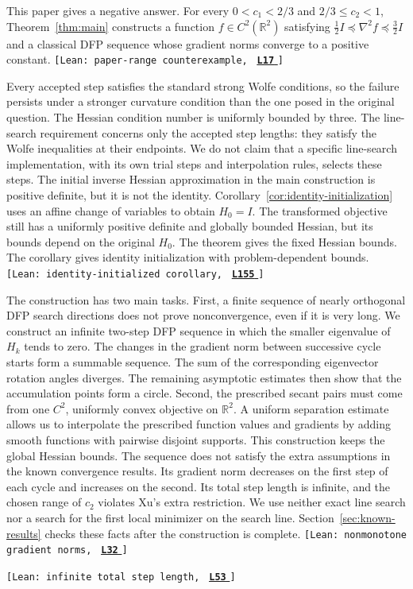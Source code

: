 \documentclass[11pt]{article}
\newcommand{\R}{\mathbb R}
\newcommand{\leanLinkText}[1]{%
  \underline{\textbf{#1}}%
}
\newcommand{\leanSnapshot}{e308927f5b7930bdd002f0c0e42b9d112ad821cb}
\newcommand{\leanClaimTag}[3]{%
  {\footnotesize\texttt{[Lean: #1, }}%
  \href{https://github.com/imathwy/DFP_wolfe_local/blob/\leanSnapshot/#2?plain=1\#L#3}%
    {\leanLinkText{\footnotesize\texttt{L#3}}}%
  {\footnotesize\texttt{]}}\enspace
}
\begin{document}
This paper gives a negative answer.  For every $0<c_1<2/3$ and
$2/3\le c_2<1$, Theorem~\ref{thm:main} constructs a function
$f\in C^2(\R^2)$ satisfying $\frac12I\preceq\nabla^2f\preceq\frac32I$ and a
classical DFP sequence whose gradient norms converge to a positive constant.
\leanClaimTag{paper-range counterexample}{DFPWolfe/A_uniformly_convex_counterexample_to_global_convergence_of_DFP_under_weak_Wolfe_/Theorem_Main_theorem.lean}{17}
Every accepted step satisfies the standard strong Wolfe conditions, so the
failure persists under a stronger curvature condition than the one posed in
the original question.  The Hessian condition number is uniformly bounded by
three.  The line-search requirement concerns only the accepted step lengths:
they satisfy the Wolfe inequalities at their endpoints.  We do not claim that
a specific line-search implementation, with its own trial steps and
interpolation rules, selects these steps.  The initial inverse Hessian
approximation in the main construction is positive definite, but it is not the
identity.  Corollary~\ref{cor:identity-initialization} uses an affine change of
variables to obtain $H_0=I$.  The transformed objective still has a uniformly
positive definite and globally bounded Hessian, but its bounds depend on the
original $H_0$.  The theorem gives the fixed Hessian bounds.  The corollary
gives identity initialization with problem-dependent bounds.
\leanClaimTag{identity-initialized corollary}{DFPWolfe/A_uniformly_convex_counterexample_to_global_convergence_of_DFP_under_weak_Wolfe_/Theorem_Main_theorem.lean}{155}

The construction has two main tasks.  First, a finite sequence of nearly
orthogonal DFP search directions does not prove nonconvergence, even if it is
very long.  We construct an infinite two-step DFP sequence in which the
smaller eigenvalue of $H_k$ tends to zero.
The changes in the gradient norm between successive cycle starts form a
summable sequence.  The sum of the corresponding eigenvector rotation angles
diverges.  The remaining asymptotic estimates then show that the accumulation
points form a circle.  Second, the prescribed secant pairs must come from one
$C^2$, uniformly convex objective on $\R^2$.  A uniform separation estimate
allows us to interpolate the prescribed function values and gradients by
adding smooth functions with pairwise disjoint supports.  This construction
keeps the global Hessian bounds.  The sequence does not satisfy the extra
assumptions in the known convergence results.  Its gradient norm decreases on
the first step of each cycle and increases on the second.  Its total step
length is infinite, and the chosen range of $c_2$ violates Xu's extra
restriction.  We use neither exact line search nor a search for the first
local minimizer on the search line.  Section~\ref{sec:known-results} checks
these facts after the construction is complete.
\leanClaimTag{nonmonotone gradient norms}{DFPWolfe/A_uniformly_convex_counterexample_to_global_convergence_of_DFP_under_weak_Wolfe_/Remark_6_8_Gradient_norms_are_not_eventually_monotone.lean}{32}
\leanClaimTag{infinite total step length}{DFPWolfe/A_uniformly_convex_counterexample_to_global_convergence_of_DFP_under_weak_Wolfe_/Remark_6_9_The_total_step_length_diverges.lean}{53}
\end{document}
